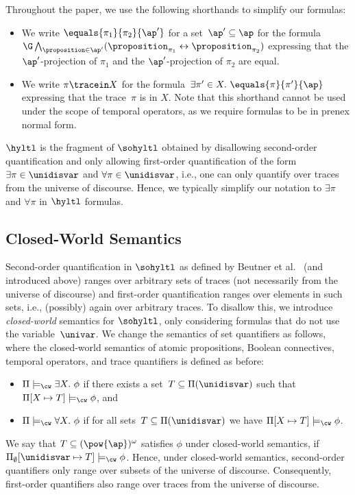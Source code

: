 Throughout the paper, we use the following shorthands to simplify our formulas:
\begin{itemize}
    
    \item We write $\equals{\pi_1}{\pi_2}{\ap'}$ for a set~$\ap' \subseteq \ap$ for the formula~$ \G\bigwedge_{\proposition\in\ap'}(\proposition_{\pi_1} \leftrightarrow \proposition_{\pi_2})$ expressing that the $\ap'$-projection of $\pi_1$ and the $\ap'$-projection of $\pi_2$ are equal.
    
    \item We write $\pi\tracein X $  for the formula~$\exists \pi' \in X.\ \equals{\pi}{\pi'}{\ap}$ expressing that the trace~$\pi$ is in $X$. Note that this shorthand cannot be used under the scope of temporal operators, as we require formulas to be in prenex normal form.

\end{itemize}


\begin{rem}
\label{rem_hyltlisfragment}
$\hyltl$ is the fragment of $\sohyltl$ obtained by disallowing second-order quantification and only allowing first-order quantification of the form~$\exists \pi \in \unidisvar$ and $\forall \pi \in \unidisvar$, i.e., one can only quantify over traces from the universe of discourse.
Hence, we typically simplify our notation to $\exists\pi$ and $\forall\pi$ in $\hyltl$ formulas.
\end{rem}

\subsection{Closed-World Semantics}
Second-order quantification in $\sohyltl$ as defined by Beutner et al.~\cite{DBLP:conf/cav/BeutnerFFM23} (and introduced above) ranges over arbitrary sets of traces (not necessarily from the universe of discourse) and first-order quantification ranges over elements in such sets, i.e., (possibly) again over arbitrary traces.
To disallow this, we introduce \emph{closed-world} semantics for $\sohyltl$, only considering formulas that do not use the variable~$\univar$. We change the semantics of set quantifiers as follows, 
where the closed-world semantics of atomic propositions, Boolean connectives, temporal operators, and trace quantifiers is defined as before:
\begin{itemize}
    \item $\Pi \models_\cw \exists X.\ \phi$ if there exists a set~$T \subseteq \Pi(\unidisvar)$ such that $\Pi[X\mapsto T] \models_\cw \phi$, and 
    \item $\Pi \models_\cw \forall X.\ \phi$ if for all sets~$T \subseteq \Pi(\unidisvar)$ we have $\Pi[X\mapsto T] \models_\cw \phi$.
\end{itemize}
We say that $T \subseteq (\pow{\ap})^\omega$ satisfies $\phi$ under closed-world semantics, if $\Pi_\emptyset[\unidisvar \mapsto T] \models_\cw \phi$.
Hence, under closed-world semantics, second-order quantifiers only range over subsets of the universe of discourse. 
Consequently, first-order quantifiers also range over traces from the universe of discourse. 

